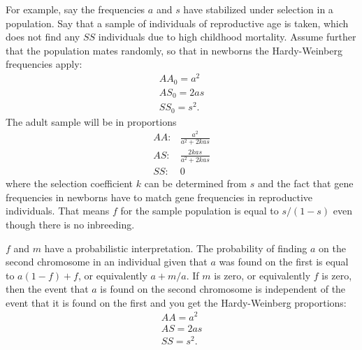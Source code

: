 \documentclass[a4paper]{article}
\begin{document}
For example, say the frequencies $a$ and $s$ have stabilized under selection in a population. Say that a sample of individuals of reproductive age is taken, which does not find any $SS$ individuals due to high childhood mortality. Assume further that the population mates randomly, so that in newborns the Hardy-Weinberg frequencies apply:
\begin{eqnarray*}
    AA_0 = a^2\\
    AS_0 = 2as\\
    SS_0 = s^2.
\end{eqnarray*}
The adult sample will be in proportions 
\begin{eqnarray*}
    AA:&\frac{a^2}{a^2+2kas}\\
    AS:&\frac{2kas}{a^2+2kas}\\
    SS:&0
\end{eqnarray*}
where the selection coefficient $k$ can be determined from $s$ and the fact that gene frequencies in newborns have to match gene frequencies in reproductive individuals. That means $f$ for the sample population is equal to $s/(1-s)$ even though there is no inbreeding.

\bigskip
$f$ and $m$ have a probabilistic interpretation. The probability of finding $a$ on the second chromosome in an individual given that $a$ was found on the first is equal to $a(1-f)+f$, or equivalently $a+m/a$. If $m$ is zero, or equivalently $f$ is zero, then the event that $a$ is found on the second chromosome is independent of the event that it is found on the first and you get the Hardy-Weinberg proportions:
\begin{eqnarray*}
    AA=a^2\\
    AS=2as\\
    SS=s^2.
\end{eqnarray*}
\end{document}
